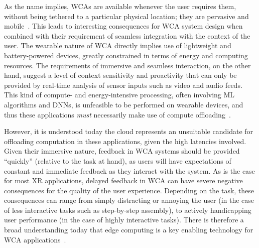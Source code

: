 As the name implies, \glspl{WCA} are available whenever the user requires them, without being tethered to a particular physical location;
they are pervasive and mobile~\cite{ha2014towards}.
This leads to interesting consequences for \gls{WCA} system design when combined with their requirement of seamless integration with the context of the user.
The wearable nature of \gls{WCA} directly implies use of lightweight and battery-powered devices, greatly constrained in terms of energy and computing resources.
The requirements of immersive and seamless interaction, on the other hand, suggest a level of context sensitivity and proactivity that can only be provided by real-time analysis of sensor inputs such as video and audio feeds.
This kind of compute- and energy-intensive processing, often involving \gls{ML} algorithms and \glspl{DNN}, is unfeasible to be performed on wearable devices, and thus these applications \emph{must} necessarily make use of compute offloading~\cite{ha2014towards,wang2020scaling}.

However, it is understood today the cloud represents an unsuitable candidate for offloading computation in these applications, given the high latencies involved.
Given their immersive nature, feedback in \gls{WCA} systems should be provided ``quickly'' (relative to the task at hand), as users will have expectations of constant and immediate feedback as they interact with the system.
As is the case for most \gls{XR} applications, delayed feedback in \gls{WCA} can have severe negative consequences for the quality of the user experience.
Depending on the task, these consequences can range from simply distracting or annoying the user (in the case of less interactive tasks such as step-by-step assembly), to actively handicapping user performance (in the case of highly interactive tasks).
There is therefore a broad understanding today that edge computing is a key enabling technology for \gls{WCA} applications~\cite{ha2014towards,wang2020scaling,chen2018application,olguinmunoz2021impact}.

